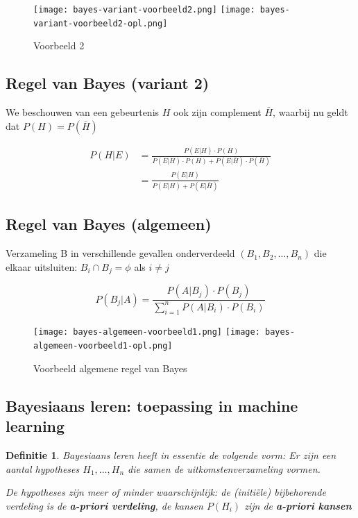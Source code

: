 \documentclass{article}
\newtheorem{theorem}{Definitie}[section]
\begin{document}
\begin{figure}[H]
    \centering
    \texttt{[image: bayes-variant-voorbeeld2.png]}
    \texttt{[image: bayes-variant-voorbeeld2-opl.png]}
    \caption{Voorbeeld 2}
\end{figure}

\subsection{Regel van Bayes (variant 2)}

We beschouwen van een gebeurtenis $H$ ook zijn complement $\bar{H}$, 
waarbij nu geldt dat $P(H) = P(\bar{H})$


\begin{equation}
    \begin{aligned}
        P(H | E) & = \frac{P(E | H) \cdot P(H)}{P(E | H) \cdot P(H) + P(E | \bar{H}) \cdot P(\bar{H})}\\
        & = \frac{P(E | H)}{P(E | H) + P(E | \bar{H})}
    \end{aligned}
\end{equation}

\subsection{Regel van Bayes (algemeen)}

Verzameling B in verschillende gevallen onderverdeeld $(B_1, B_2, \dots, B_n)$ die elkaar
uitsluiten: $B_i \cap B_j = \phi$ als $i \neq j$

\begin{equation}
    P(B_j | A) = \frac{P(A | B_j) \cdot P(B_j)}{\sum_{i=1}^n P(A|B_i) \cdot P(B_i)}
\end{equation}

\begin{figure}[H]
    \centering
    \texttt{[image: bayes-algemeen-voorbeeld1.png]}
    \texttt{[image: bayes-algemeen-voorbeeld1-opl.png]}
    \caption{Voorbeeld algemene regel van Bayes}
\end{figure}

\subsection{Bayesiaans leren: toepassing in machine learning}

\begin{theorem}
    Bayesiaans leren heeft in essentie de volgende vorm: Er zijn een aantal hypotheses $H_1, \dots, H_n$ die samen de uitkomstenverzameling vormen.

    De hypotheses zijn meer of minder waarschijnlijk: de (initiële) bijbehorende verdeling is de \textbf{a-priori verdeling}, de kansen
    $P(H_i)$ zijn de \textbf{a-priori kansen}
\end{theorem}
\end{document}
